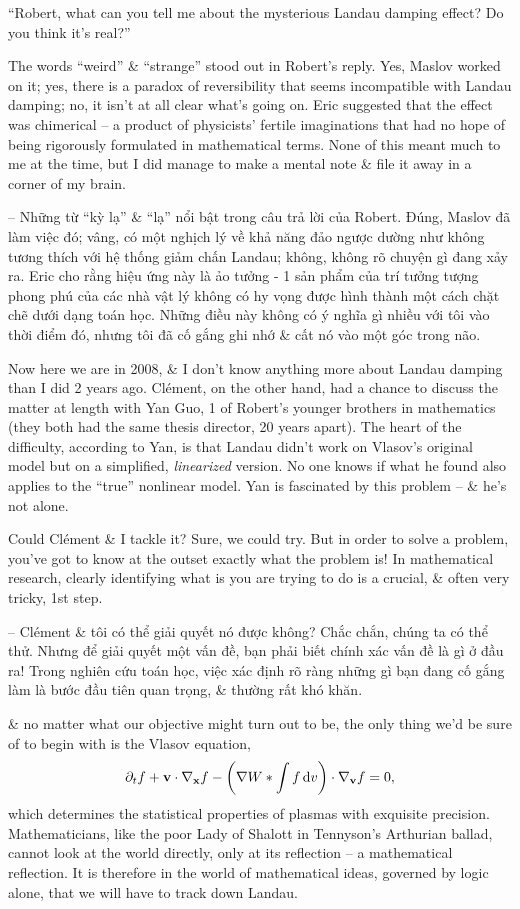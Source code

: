 \documentclass{article}
\begin{document}
\begin{enumerate}
	``Robert, what can you tell me about the mysterious Landau damping effect? Do you think it's real?''
	
	The words ``weird'' \& ``strange'' stood out in Robert's reply. Yes, Maslov worked on it; yes, there is a paradox of reversibility that seems incompatible with Landau damping; no, it isn't at all clear what's going on. Eric suggested that the effect was chimerical -- a product of physicists' fertile imaginations that had no hope of being rigorously formulated in mathematical terms. None of this meant much to me at the time, but I did manage to make a mental note \& file it away in a corner of my brain.
	
	-- Những từ ``kỳ lạ'' \& ``lạ'' nổi bật trong câu trả lời của Robert. Đúng, Maslov đã làm việc đó; vâng, có một nghịch lý về khả năng đảo ngược dường như không tương thích với hệ thống giảm chấn Landau; không, không rõ chuyện gì đang xảy ra. Eric cho rằng hiệu ứng này là ảo tưởng - 1 sản phẩm của trí tưởng tượng phong phú của các nhà vật lý không có hy vọng được hình thành một cách chặt chẽ dưới dạng toán học. Những điều này không có ý nghĩa gì nhiều với tôi vào thời điểm đó, nhưng tôi đã cố gắng ghi nhớ \& cất nó vào một góc trong não.
	
	Now here we are in 2008, \& I don't know anything more about Landau damping than I did 2 years ago. Cl\'ement, on the other hand, had a chance to discuss the matter at length with Yan Guo, 1 of Robert's younger brothers in mathematics (they both had the same thesis director, 20 years apart). The heart of the difficulty, according to Yan, is that Landau didn't work on Vlasov's original model but on a simplified, {\it linearized} version. No one knows if what he found also applies to the ``true'' nonlinear model. Yan is fascinated by this problem -- \& he's not alone.
	
	Could Cl\'ement \& I tackle it? Sure, we could try. But in order to solve a problem, you've got to know at the outset exactly what the problem is! In mathematical research, clearly identifying what is you are trying to do is a crucial, \& often very tricky, 1st step.
	
	-- Cl\'ement \& tôi có thể giải quyết nó được không? Chắc chắn, chúng ta có thể thử. Nhưng để giải quyết một vấn đề, bạn phải biết chính xác vấn đề là gì ở đầu ra! Trong nghiên cứu toán học, việc xác định rõ ràng những gì bạn đang cố gắng làm là bước đầu tiên quan trọng, \& thường rất khó khăn.
	
	\& no matter what our objective might turn out to be, the only thing we'd be sure of to begin with is the Vlasov equation,
	\begin{equation}
		\label{Vlasov}
		\partial_tf + {\bf v}\cdot\nabla_{\bf x}f - \left(\nabla W*\int f\,{\rm d}v\right)\cdot\nabla_{\bf v}f = 0,
	\end{equation}
	which determines the statistical properties of plasmas with exquisite precision. Mathematicians, like the poor Lady of Shalott in Tennyson's Arthurian ballad, cannot look at the world directly, only at its reflection -- a mathematical reflection. It is therefore in the world of mathematical ideas, governed by logic alone, that we will have to track down Landau.
	

\end{enumerate}
\end{document}
